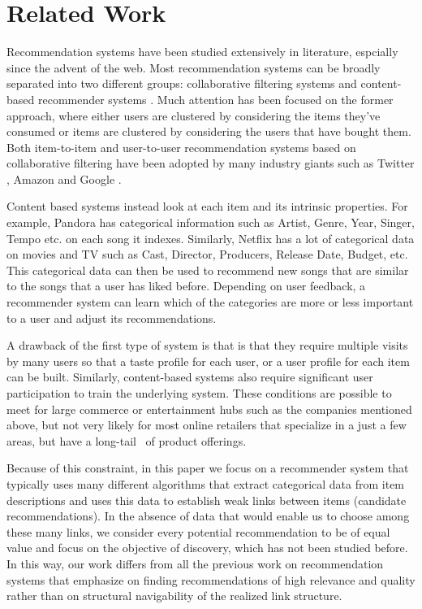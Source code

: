 \section{Related Work}

Recommendation systems have been studied extensively in literature, espcially since the advent of the web. Most recommendation systems can be broadly separated into two different groups: collaborative filtering systems and content-based recommender systems \cite{almazro2010survey}. Much attention has been focused on the former approach, where either users are clustered by considering the items they've consumed or items are clustered by considering the users that have bought them. Both item-to-item and user-to-user recommendation systems based on collaborative filtering have been adopted by many industry giants such as Twitter \cite{twitter-collab-filtering}, Amazon \cite{amazon-collab-filtering} and Google \cite{google-collab-filtering}.  \vs

Content based systems instead look at each item and its intrinsic properties. For example, Pandora has categorical information such as Artist, Genre, Year, Singer, Tempo etc. on each song it indexes. Similarly, Netflix has a lot of categorical data on movies and TV such as Cast, Director, Producers, Release Date, Budget, etc. This categorical data can then be used to recommend new songs that are similar to the songs that a user has liked before. Depending on user feedback, a recommender system can learn which of the categories are more or less important to a user and adjust its recommendations. \vs

A drawback of the first type of system is that is that they require multiple visits by many users so that a taste profile for each user, or a user profile for each item can be built. 
Similarly, content-based systems also require significant user participation to train the underlying system. These conditions are possible to meet for large commerce or entertainment hubs such as the companies mentioned above, but not very likely for most online retailers that specialize in a just a few areas, but have a long-tail~\cite{Anderson2006} of product offerings. \vs

Because of this constraint, in this paper we focus on a recommender system that typically uses many different algorithms that extract categorical data from item descriptions and uses this data to establish weak links between items (candidate recommendations). In the absence of data that would enable us to choose among these many links, we consider every potential recommendation to be of equal value and focus on the objective of discovery, which has not been studied before. In this way, our work differs from all the previous work on recommendation systems that emphasize on finding recommendations of high relevance and quality rather than on structural navigability of the realized link structure.\vs

